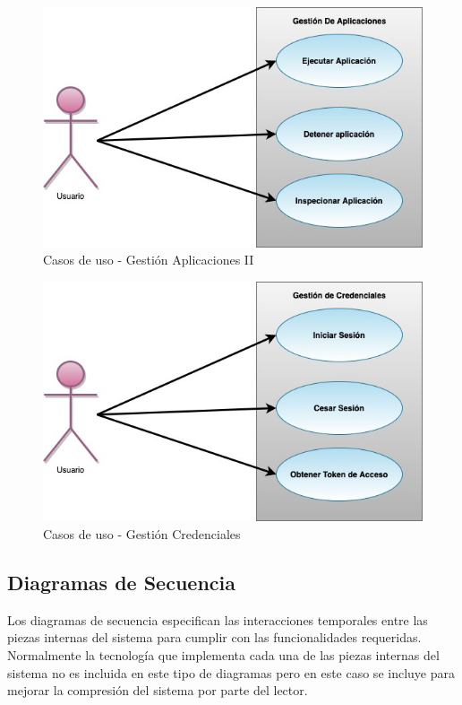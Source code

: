 \documentclass[a4paper,11pt]{book}
\begin{document}
\begin{figure}[H]
\centering
\includegraphics[scale=0.50]{imagenes/casosUso2.jpg}
\caption{ Casos de uso - Gestión Aplicaciones II\cite{diagrama}  }
\end{figure}

\begin{figure}[H]
\centering
\includegraphics[scale=0.50]{imagenes/casosUso3.jpg}
\caption{ Casos de uso - Gestión Credenciales\cite{diagrama}  }
\end{figure}

\subsection{Diagramas de Secuencia}
Los diagramas de secuencia especifican las interacciones temporales entre las piezas internas del sistema para cumplir con las funcionalidades requeridas. Normalmente la tecnología que implementa cada una de las piezas internas del sistema no es incluida en este tipo de diagramas pero en este caso se incluye para mejorar la compresión del sistema por parte del lector. 
\end{document}
